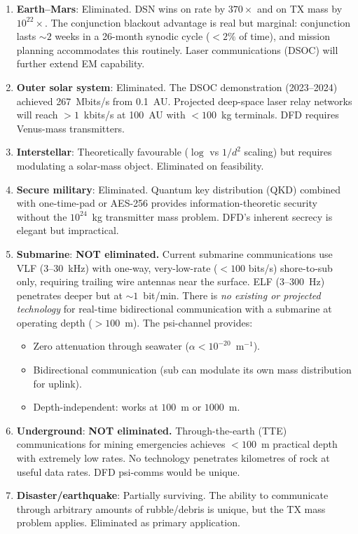 \documentclass[11pt]{article}
\theoremstyle{definition}
\theoremstyle{remark}
\begin{document}
\begin{enumerate}
\item \textbf{Earth--Mars}: Eliminated. DSN wins on rate by $370\times$ and
  on TX mass by $10^{22}\times$. The conjunction blackout advantage is real
  but marginal: conjunction lasts $\sim 2$ weeks in a 26-month synodic cycle
  ($<2\%$ of time), and mission planning accommodates this routinely.
  Laser communications (DSOC) will further extend EM capability.

\item \textbf{Outer solar system}: Eliminated. The DSOC demonstration
  (2023--2024) achieved 267~Mbits/s from 0.1~AU. Projected deep-space laser
  relay networks will reach $>1$~kbits/s at 100~AU with $<100$~kg terminals.
  DFD requires Venus-mass transmitters.

\item \textbf{Interstellar}: Theoretically favourable ($\log$ vs $1/d^2$
  scaling) but requires modulating a solar-mass object. Eliminated on
  feasibility.

\item \textbf{Secure military}: Eliminated. Quantum key distribution (QKD)
  combined with one-time-pad or AES-256 provides information-theoretic
  security without the $10^{24}$~kg transmitter mass problem. DFD's
  inherent secrecy is elegant but impractical.

\item \textbf{Submarine}: \textbf{NOT eliminated.} Current submarine
  communications use VLF (3--30~kHz) with one-way, very-low-rate ($<100$
  bits/s) shore-to-sub only, requiring trailing wire antennas near the
  surface. ELF (3--300~Hz) penetrates deeper but at $\sim 1$~bit/min.
  There is \emph{no existing or projected technology} for real-time
  bidirectional communication with a submarine at operating depth
  ($>100$~m). The psi-channel provides:
  \begin{itemize}[nosep]
  \item Zero attenuation through seawater ($\alpha < 10^{-20}$~m$^{-1}$).
  \item Bidirectional communication (sub can modulate its own mass
    distribution for uplink).
  \item Depth-independent: works at $100$~m or $1000$~m.
  \end{itemize}

\item \textbf{Underground}: \textbf{NOT eliminated.} Through-the-earth
  (TTE) communications for mining emergencies achieves $<100$~m practical
  depth with extremely low rates. No technology penetrates kilometres
  of rock at useful data rates. DFD psi-comms would be unique.

\item \textbf{Disaster/earthquake}: Partially surviving. The ability
  to communicate through arbitrary amounts of rubble/debris is unique,
  but the TX mass problem applies. Eliminated as primary application.
\end{enumerate}
\end{document}
